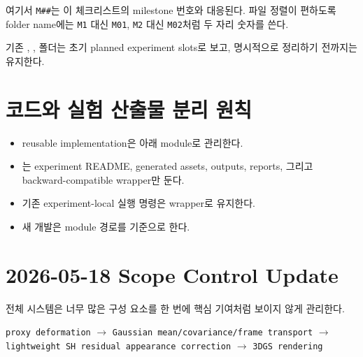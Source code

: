 \documentclass[10pt]{article}
\newcommand{\code}[1]{\texttt{#1}}
\begin{document}
여기서 \code{M\#\#}는 이 체크리스트의 milestone 번호와 대응된다. 파일 정렬이 편하도록 folder name에는 \code{M1} 대신 \code{M01}, \code{M2} 대신 \code{M02}처럼 두 자리 숫자를 쓴다.

기존 , ,  폴더는 초기 planned experiment slots로 보고, 명시적으로 정리하기 전까지는 유지한다.

\section*{코드와 실험 산출물 분리 원칙}

\begin{itemize}
  \item reusable implementation은  아래 module로 관리한다.
  \item {}는 experiment README, generated assets, outputs, reports, 그리고 backward-compatible wrapper만 둔다.
  \item 기존 experiment-local 실행 명령은 wrapper로 유지한다.
  \item 새 개발은  module 경로를 기준으로 한다.
\end{itemize}

\section*{2026-05-18 Scope Control Update}

전체 시스템은 너무 많은 구성 요소를 한 번에 핵심 기여처럼 보이지 않게 관리한다.

\begin{tcolorbox}[colback=LightBlue, colframe=blue!45!black, title=Core runtime stack, fonttitle=\bfseries]
\begin{center}
\code{proxy deformation}
\(\rightarrow\)
\code{Gaussian mean/covariance/frame transport}
\(\rightarrow\)
\code{lightweight SH residual appearance correction}
\(\rightarrow\)
\code{3DGS rendering}
\end{center}
\end{tcolorbox}
\end{document}
